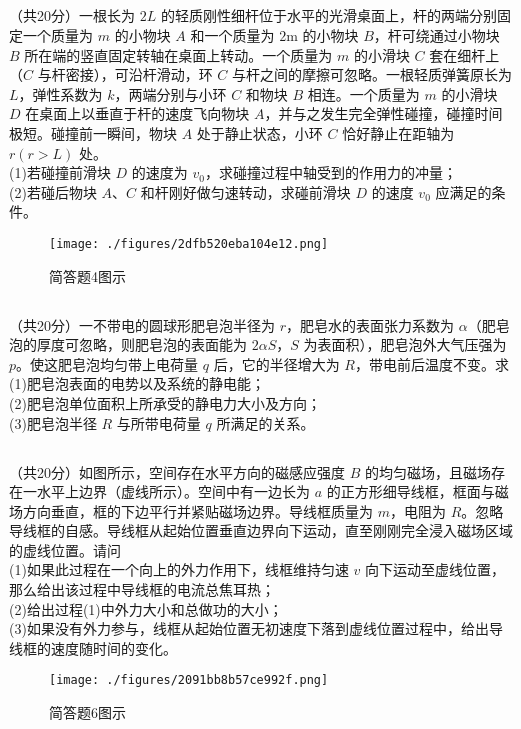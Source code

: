 \subsection{ }
（共20分）一根长为 $2L$ 的轻质刚性细杆位于水平的光滑桌面上，杆的两端分别固定一个质量为 $m$ 的小物块 $A$ 和一个质量为 $2\mathrm{m}$ 的小物块 $B$，杆可绕通过小物块 $B$ 所在端的竖直固定转轴在桌面上转动。一个质量为 $m$ 的小滑块 $C$ 套在细杆上（$C$ 与杆密接），可沿杆滑动，环 $C$ 与杆之间的摩擦可忽略。一根轻质弹簧原长为 $L$，弹性系数为 $k$，两端分别与小环 $C$ 和物块 $B$ 相连。一个质量为 $m$ 的小滑块 $D$ 在桌面上以垂直于杆的速度飞向物块 $A$，并与之发生完全弹性碰撞，碰撞时间极短。碰撞前一瞬间，物块 $A$ 处于静止状态，小环 $C$ 恰好静止在距轴为 $r(r>L)$ 处。\\
(1)若碰撞前滑块 $D$ 的速度为 $v_{0}$，求碰撞过程中轴受到的作用力的冲量；\\
(2)若碰后物块 $A$、$C$ 和杆刚好做匀速转动，求碰前滑块 $D$ 的速度 $v_{0}$ 应满足的条件。\\
\begin{figure}[ht]
\centering
\texttt{[image: ./figures/2dfb520eba104e12.png]}
\caption{简答题4图示} \label{fig_CAS17_5}
\end{figure}
\subsection{ }
（共20分）一不带电的圆球形肥皂泡半径为 $r$，肥皂水的表面张力系数为 $\alpha$（肥皂泡的厚度可忽略，则肥皂泡的表面能为 $2 \alpha S$，$S$ 为表面积），肥皂泡外大气压强为 $p$。使这肥皂泡均匀带上电荷量 $q$ 后，它的半径增大为 $R$，带电前后温度不变。求\\
(1)肥皂泡表面的电势以及系统的静电能；\\
(2)肥皂泡单位面积上所承受的静电力大小及方向；\\
(3)肥皂泡半径 $R$ 与所带电荷量 $q$ 所满足的关系。\\
\subsection{ }
（共20分）如图所示，空间存在水平方向的磁感应强度 $B$ 的均匀磁场，且磁场存在一水平上边界（虚线所示）。空间中有一边长为 $a$ 的正方形细导线框，框面与磁场方向垂直，框的下边平行并紧贴磁场边界。导线框质量为 $m$，电阻为 $R$。忽略导线框的自感。导线框从起始位置垂直边界向下运动，直至刚刚完全浸入磁场区域的虚线位置。请问\\
(1)如果此过程在一个向上的外力作用下，线框维持匀速 $v$ 向下运动至虚线位置，那么给出该过程中导线框的电流总焦耳热；\\
(2)给出过程(1)中外力大小和总做功的大小；\\
(3)如果没有外力参与，线框从起始位置无初速度下落到虚线位置过程中，给出导线框的速度随时间的变化。\\
\begin{figure}[ht]
\centering
\texttt{[image: ./figures/2091bb8b57ce992f.png]}
\caption{简答题6图示} \label{fig_CAS17_6}
\end{figure}

